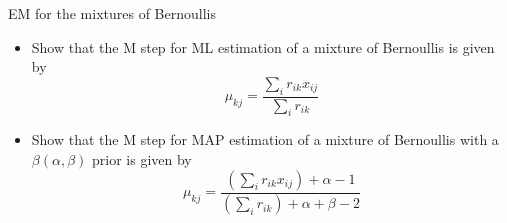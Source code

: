 \documentclass[a4paper,twoside=false,abstract=false,numbers=noenddot,
titlepage=false,headings=small,parskip=half,version=last]{scrartcl}
\begin{document}
\begin{exercise}{11.3} EM for the mixtures of Bernoullis\\ 
    \begin{itemize}
        \item Show that the M step for ML estimation of a mixture of Bernoullis
            is given by
            \begin{equation}
                \label{eq:EM_ML_Ber}
                \mu_{kj} = 
                \frac
                {
                    \sum_i{
                        r_{ik}x_{ij}
                    }
                }
                {
                \sum_i{
                    r_{ik}
                }
            } 
            \end{equation}
        \item Show that the M step for MAP estimation of a mixture of
        Bernoullis with a $\beta(\alpha,\beta)$ prior is given by
            \begin{equation}
                \label{eq:EM_MAP_Ber}
                \mu_{kj} = 
                \frac
                {
                    (\sum_i{
                        r_{ik}x_{ij}
                    }) + \alpha - 1
                }
                {
                    (\sum_i{
                        r_{ik}
                    }) + \alpha + \beta - 2
                }
            \end{equation}
    \end{itemize}
\end{exercise}
\end{document}
